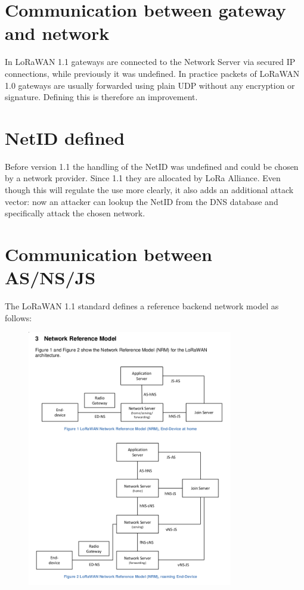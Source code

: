 {\section{Communication between gateway and network}

{In LoRaWAN 1.1 gateways are connected to the Network Server via secured IP connections, while previously it was undefined. In practice
packets of LoRaWAN 1.0 gateways are usually forwarded using plain UDP without
any encryption or signature. Defining this is therefore an improvement.}

\hypertarget{h.jom2i6adwnnm}{\section{\texorpdfstring{{NetID
defined}}{NetID defined}}\label{h.jom2i6adwnnm}}

{Before version 1.1 the handling of the NetID was undefined and could be
chosen by a network provider. Since 1.1 they are allocated by LoRa
Alliance. Even though this will regulate the use more clearly, it also
adds an additional attack vector: now an attacker can lookup the NetID
from the DNS database and specifically attack the chosen network.}

\hypertarget{h.rext4wcd7qnn}{\section{\texorpdfstring{{Communication
between
AS/NS/JS}}{Communication between AS/NS/JS}}\label{h.rext4wcd7qnn}}

{The LoRaWAN 1.1 standard defines a reference backend network model as
follows:}
\begin{figure}[h!]
{\includegraphics[width=0.8\textwidth]{images/image20.png}}
\end{figure}

}
